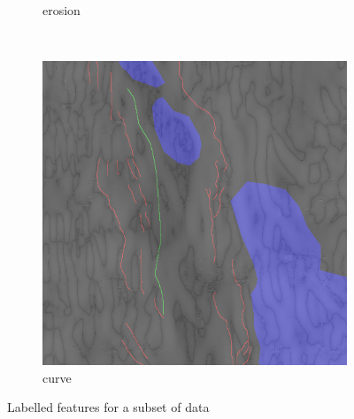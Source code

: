 \documentclass[11pt,a4paper]{article}
\begin{document}
\begin{figure}[t]
\begin{subfigure}[b]{0.18\textwidth}
        \caption{erosion}
        \label{fig:features_erosion}
    \end{subfigure}
    ~
    \begin{subfigure}[b]{0.18\textwidth}
        \includegraphics[width=\textwidth]{graphics/data/0/features_curve.png}
        \caption{curve}
        \label{fig:features_curve}
    \end{subfigure}
    \caption{Labelled features for a subset of data}\label{fig:features}
\end{figure}
\end{document}
